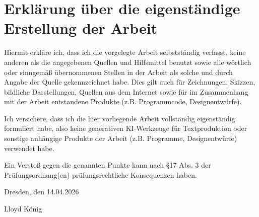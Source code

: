 \cleardoublepage

\pagestyle{empty}
\setlength{\parindent}{0pt}

\hspace{0pt}
\vfill

\section*{Erklärung über die eigenständige Erstellung der Arbeit}

Hiermit erkläre ich, dass ich die vorgelegte Arbeit selbstständig verfasst, keine anderen als die angegebenen Quellen und Hilfsmittel benutzt sowie alle wörtlich oder sinngemäß übernommenen Stellen in der Arbeit als solche und durch Angabe der Quelle gekennzeichnet habe. Dies gilt auch für Zeichnungen, Skizzen, bildliche Darstellungen, Quellen aus dem Internet sowie für im
Zusammenhang mit der Arbeit entstandene Produkte (z.B. Programmcode, Designentwürfe).

Ich versichere, dass ich die hier vorliegende Arbeit vollständig eigenständig formuliert habe, also keine generativen KI-Werkzeuge für Textproduktion oder sonstige anhängige Produkte der Arbeit (z.B. Programme, Designentwürfe) verwendet habe.

Ein Verstoß gegen die genannten Punkte kann nach §17 Abs. 3 der Prüfungsordnung(en) prüfungsrechtliche Konsequenzen haben.

\vspace{1em}

Dresden, den 14.04.2026

\vspace{3em}

Lloyd König

\vfill
\vfill
